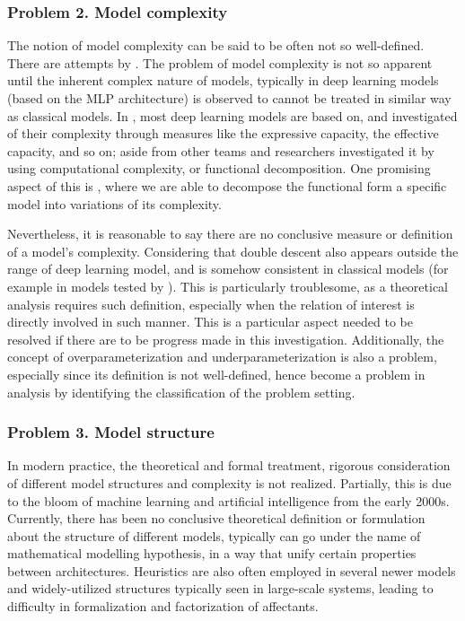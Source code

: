 \documentclass[10pt]{article}
\begin{document}
\subsubsection*{Problem 2. Model complexity}
The notion of model complexity can be said to be often not so well-defined. There are attempts by \cite{hu2021modelcomplexitydeeplearning,luo2024investigatingimpactmodelcomplexity,barceló2020modelinterpretabilitylenscomputational,Molnar_2020,janik2021complexitydeepneuralnetworks}. The problem of model complexity is not so apparent until the inherent complex nature of models, typically in deep learning models (based on the MLP architecture) is observed to cannot be treated in similar way as classical models. In \cite{hu2021modelcomplexitydeeplearning}, most deep learning models are based on, and investigated of their complexity through measures like the expressive capacity, the effective capacity, and so on; aside from other teams and researchers investigated it by using computational complexity, or functional decomposition. One promising aspect of this is \cite{Molnar_2020}, where we are able to decompose the functional form a specific model into variations of its complexity. 

Nevertheless, it is reasonable to say there are no conclusive measure or definition of a model's complexity. Considering that double descent also appears outside the range of deep learning model, and is somehow consistent in classical models (for example in models tested by \cite{belkin_reconciling_2019}). This is particularly troublesome, as a theoretical analysis requires such definition, especially when the relation of interest is directly involved in such manner. This is a particular aspect needed to be resolved if there are to be progress made in this investigation. Additionally, the concept of overparameterization and underparameterization is also a problem, especially since its definition is not well-defined, hence become a problem in analysis by identifying the classification of the problem setting. 
\subsubsection*{Problem 3. Model structure}

In modern practice, the theoretical and formal treatment, rigorous consideration of different model structures and complexity is not realized. Partially, this is due to the bloom of machine learning and artificial intelligence from the early 2000s. Currently, there has been no conclusive theoretical definition or formulation about the structure of different models, typically can go under the name of mathematical modelling hypothesis, in a way that unify certain properties between architectures. Heuristics are also often employed in several newer models and widely-utilized structures typically seen in large-scale systems, leading to difficulty in formalization and factorization of affectants. 
\end{document}
